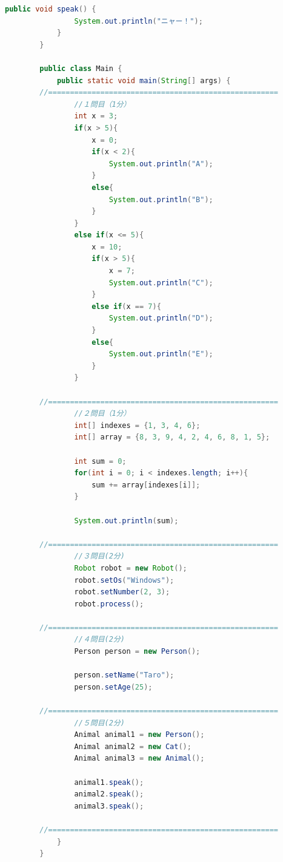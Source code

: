 \documentclass[paper=a4paper,fontsize=11pt]{jlreq}
\begin{document}
\begin{lstlisting}[language=Java, caption=実験で被験者に提示したソースコード]
            public void speak() {
                System.out.println("ニャー！");
            }
        }

        public class Main {
            public static void main(String[] args) {
        //=====================================================
                //１問目（1分）
                int x = 3;
                if(x > 5){
                    x = 0;
                    if(x < 2){
                        System.out.println("A");
                    }
                    else{
                        System.out.println("B");
                    }
                }
                else if(x <= 5){
                    x = 10;
                    if(x > 5){
                        x = 7;
                        System.out.println("C");
                    }
                    else if(x == 7){
                        System.out.println("D");
                    }
                    else{
                        System.out.println("E");
                    }
                }

        //=====================================================
                //２問目（1分）
                int[] indexes = {1, 3, 4, 6};
                int[] array = {8, 3, 9, 4, 2, 4, 6, 8, 1, 5};

                int sum = 0;
                for(int i = 0; i < indexes.length; i++){
                    sum += array[indexes[i]];
                }

                System.out.println(sum);

        //=====================================================
                //３問目(2分)
                Robot robot = new Robot();
                robot.setOs("Windows");
                robot.setNumber(2, 3);
                robot.process();

        //=====================================================
                //４問目(2分)
                Person person = new Person();

                person.setName("Taro");
                person.setAge(25);

        //=====================================================
                //５問目(2分)
                Animal animal1 = new Person();
                Animal animal2 = new Cat();
                Animal animal3 = new Animal();

                animal1.speak();
                animal2.speak();
                animal3.speak();

        //=====================================================
            }
        }
      \end{lstlisting}
\end{document}
